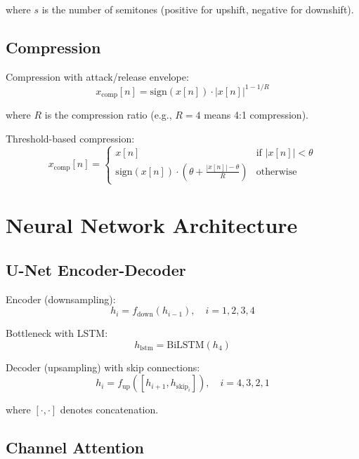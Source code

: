 \documentclass[12pt,a4paper]{article}
\begin{document}
where $s$ is the number of semitones (positive for upshift, negative for downshift).

\subsection{Compression}

Compression with attack/release envelope:
\begin{equation}
x_{\text{comp}}[n] = \text{sign}(x[n]) \cdot |x[n]|^{1 - 1/R}
\end{equation}

where $R$ is the compression ratio (e.g., $R=4$ means 4:1 compression).

Threshold-based compression:
\begin{equation}
x_{\text{comp}}[n] = \begin{cases}
x[n] & \text{if } |x[n]| < \theta \\
\text{sign}(x[n]) \cdot \left(\theta + \frac{|x[n]| - \theta}{R}\right) & \text{otherwise}
\end{cases}
\end{equation}

\section{Neural Network Architecture}

\subsection{U-Net Encoder-Decoder}

Encoder (downsampling):
\begin{equation}
h_i = f_{\text{down}}(h_{i-1}), \quad i = 1, 2, 3, 4
\end{equation}

Bottleneck with LSTM:
\begin{equation}
h_{\text{lstm}} = \text{BiLSTM}(h_4)
\end{equation}

Decoder (upsampling) with skip connections:
\begin{equation}
h_i = f_{\text{up}}([h_{i+1}, h_{\text{skip}_i}]), \quad i = 4, 3, 2, 1
\end{equation}

where $[\cdot, \cdot]$ denotes concatenation.

\subsection{Channel Attention}
\end{document}
